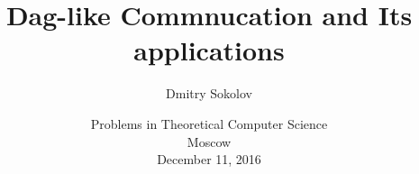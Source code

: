 

\title[Dag-like commnucation]{
	Dag-like Commnucation and Its applications
}
  
\author[Sokolov D.]{Dmitry Sokolov}

\date{Problems in Theoretical Computer Science\\
	Moscow\\
	December 11, 2016
}



	\maketitle

	



